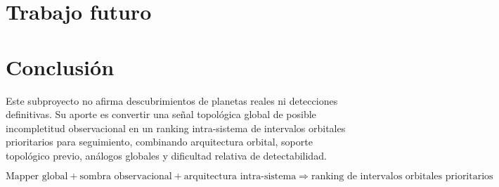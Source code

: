 \documentclass[11pt]{article}
\begin{document}
\section{Trabajo futuro}


\section*{Conclusi\'on}
Este subproyecto no afirma descubrimientos de planetas reales ni detecciones definitivas. Su aporte es convertir una se\~nal topol\'ogica global de posible incompletitud observacional en un ranking intra-sistema de intervalos orbitales prioritarios para seguimiento, combinando arquitectura orbital, soporte topol\'ogico previo, an\'alogos globales y dificultad relativa de detectabilidad.

\[
\boxed{
\text{Mapper global}
+
\text{sombra observacional}
+
\text{arquitectura intra-sistema}
\Rightarrow
\text{ranking de intervalos orbitales prioritarios}
}
\]

\nocite{singh2007topological,carlsson2009topology,nasaexoplanetarchive,borucki2010kepler,ricker2015tess,winn2010transits,lovis2011radialvelocity,gaudi2012microlensing,bowler2016imaging}
\printbibliography[title={Referencias m\'inimas de contexto}]
\end{document}
